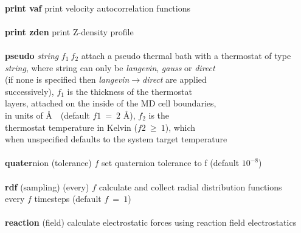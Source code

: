 \begin{tabbing}
\>                                              \> \\
\> {\bf print vaf}                              \> print velocity autocorrelation functions \\
\>                                              \> \\
\> {\bf print zden}                             \> print Z-density profile \\
\>                                              \> \\
\> {\bf pseudo} {\em string} $f_{1}~f_{2}$      \> attach a pseudo thermal bath with a thermostat of type \\
\>                                              \> {\em string}, where string can only be {\em langevin}, {\em gauss} or {\em direct} \\
\>                                              \> (if none is specified then {\em langevin$\rightarrow$direct} are applied \\
\>                                              \> successively), $f_{1}$ is the thickness of the thermostat \\
\>                                              \> layers, attached on the inside of the MD cell boundaries, \\
\>                                              \> in units of \AA~~(default $f{1}~=~2$ \AA), $f_{2}$ is the \\
\>                                              \> thermostat temperature in Kelvin ($f{2}~\ge~1$), which \\
\>                                              \> when unspecified defaults to the system target temperature \\
\>                                              \> \\
\> {\bf quater}nion (tolerance) $f$             \> set quaternion tolerance to f (default $10^{-8}$) \\
\>                                              \> \\
\> {\bf rdf} (sampling) (every) $f$             \> calculate and collect radial distribution functions \\
\>                                              \> every $f$ timesteps (default $f~=~1$) \\
\>                                              \> \\
\> {\bf reaction} (field)                       \> calculate electrostatic forces using reaction field electrostatics \\

\end{tabbing}
